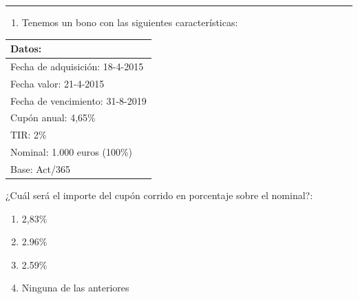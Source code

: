 \documentclass[
  letterpaper,
  DIV=11,
  numbers=noendperiod]{scrreprt}
\providecommand{\tightlist}{%
  \setlength{\itemsep}{0pt}\setlength{\parskip}{0pt}}\usepackage{longtable,booktabs,array}
\begin{document}
\begin{center}\rule{0.5\linewidth}{0.5pt}\end{center}

\begin{enumerate}
\def\labelenumi{\arabic{enumi}.}
\setcounter{enumi}{34}
\tightlist
\item
  Tenemos un bono con las siguientes características:
\end{enumerate}

\begin{longtable}[]{@{}l@{}}
\toprule()
\textbf{Datos:} \\
\midrule()
\endhead
Fecha de adquisición: 18-4-2015 \\
Fecha valor: 21-4-2015 \\
Fecha de vencimiento: 31-8-2019 \\
Cupón anual: 4,65\% \\
TIR: 2\% \\
Nominal: 1.000 euros (100\%) \\
Base: Act/365 \\
\bottomrule()
\end{longtable}

¿Cuál será el importe del cupón corrido en porcentaje sobre el nominal?:

\begin{enumerate}
\def\labelenumi{\alph{enumi}.}
\item
  2,83\%
\item
  2.96\%
\item
  2.59\%
\item
  Ninguna de las anteriores
\end{enumerate}
\end{document}
